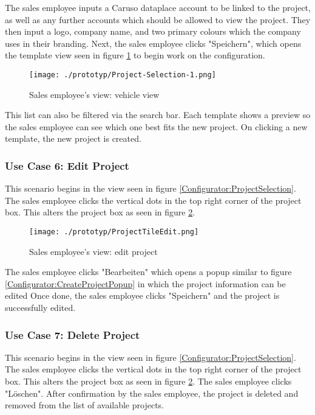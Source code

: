 The sales employee inputs a Caruso dataplace account to be linked to the project, as well as any further accounts which should be allowed to view the project. They then input a logo, company name, and two primary colours which the company uses in their branding. Next, the sales employee clicks "Speichern", which opens the template view seen in figure \ref{Configurator:Template} to begin work on the configuration.

\begin{figure}[ht]
  \centering
  \texttt{[image: ./prototyp/Project-Selection-1.png]}
  \caption{Sales employee's view: vehicle view}
  \label{Configurator:Template}
\end{figure}
This list can also be filtered via the search bar. Each template shows a preview so the sales employee can see which one best fits the new project. On clicking a new template, the new project is created. %


\subsubsection{Use Case 6: Edit Project}
This scenario begins in the view seen in figure \ref{Configurator:ProjectSelection}. The sales employee clicks the vertical dots in the top right corner of the project box. This alters the project box as seen in figure \ref{Configurator:ProjectTileEdit}.

\begin{figure}[ht]
  \centering
  \texttt{[image: ./prototyp/ProjectTileEdit.png]}
  \caption{Sales employee's view: edit project} %
  \label{Configurator:ProjectTileEdit}
\end{figure}

The sales employee clicks "Bearbeiten" which opens a popup similar to figure \ref{Configurator:CreateProjectPopup} in which the project information can be edited Once done, the sales employee clicks "Speichern" and the project is successfully edited.


\subsubsection{Use Case 7: Delete Project}
This scenario begins in the view seen in figure \ref{Configurator:ProjectSelection}. The sales employee clicks the vertical dots in the top right corner of the project box. This alters the project box as seen in figure \ref{Configurator:ProjectTileEdit}. The sales employee clicks "Löschen". After confirmation by the sales employee, the project is deleted and removed from the list of available projects.


